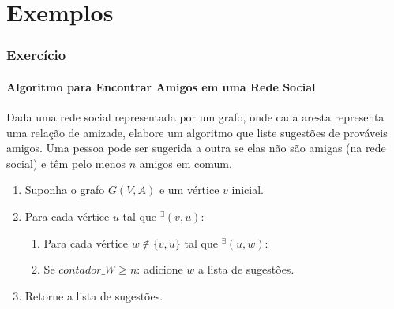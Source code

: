 
\section{Exemplos}
\begin{frame}
	\frametitle{Exercício}
	\framesubtitle{Algoritmo para Encontrar Amigos em uma Rede Social}
	
	Dada uma rede social representada por um grafo, onde cada aresta representa 
	uma relação de amizade, elabore um algoritmo que liste sugestões de prováveis 
	amigos. \pause Uma pessoa pode ser sugerida a outra se elas não são amigas 
	(na rede social) e têm pelo menos $n$ amigos em comum.
	\pause
	\begin{enumerate}
		\item Suponha o grafo $G(V,A)$ e um vértice $v$ inicial.
		\item Para cada vértice $u$ tal que $^{\exists}(v,u)$:
			\begin{enumerate}
				\item Para cada vértice $w \not\in\{v,u\}$ tal que $^{\exists}(u,w)$:
				\item Se $contador\_W \geq n$: adicione $w$ a lista de sugestões.
			\end{enumerate}
		\item Retorne a lista de sugestões.
	\end{enumerate}
\end{frame}

